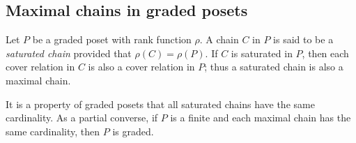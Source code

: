 \documentclass[12pt]{article}
\begin{document}
\subsection*{Maximal chains in graded posets}
Let $P$ be a graded poset with rank function $\rho$.  A chain $C$ in $P$ is said to be a \emph{saturated chain} provided that $\rho(C)=\rho(P)$.  If $C$ is saturated in $P$, then each cover relation in $C$ is also a cover relation in $P$; thus a saturated chain is also a maximal chain.  

It is a property of graded posets that all saturated chains have the same cardinality.  As a partial converse, if $P$ is a finite  and each maximal chain has the same cardinality, then $P$ is graded.
\end{document}
